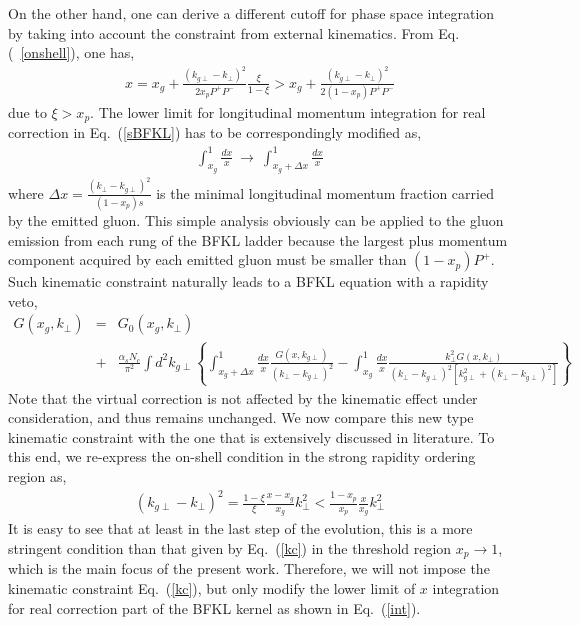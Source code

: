 \documentclass[prd,aps,preprint,tightenlines,nofootinbib,superscriptaddress]{revtex4}
\begin{document}
On the other hand, one can derive a different cutoff for phase space integration by taking into account the constraint from external kinematics.  From Eq.(~\ref{onshell}), one has,
 \begin{eqnarray}
 x = x_g+\frac{(k_{g\perp}-k_\perp)^2  }{2x_p P^+ P^-} \frac{\xi}{1-\xi}> x_g+\frac{(k_{g\perp}-k_\perp)^2  }{2(1-x_p) P^+ P^-} 
 \label{detx}
\end{eqnarray}
due to $\xi>x_p$. The lower limit for longitudinal momentum integration for real correction in Eq.~(\ref{sBFKL}) has to be correspondingly modified as,
 \begin{eqnarray}
\int_{x_g}^1 \frac{dx}{x} \  \longrightarrow \ \int_{x_g+\Delta x}^1 \frac{dx}{x}
\end{eqnarray}
where $\Delta x= \frac{(k_\perp-k_{g\perp})^2}{(1-x_p)s}$ is the minimal longitudinal momentum fraction carried by the emitted gluon.  This simple analysis obviously can be applied to the gluon emission from each rung of the BFKL ladder because the largest plus momentum component acquired by each emitted gluon must be smaller than $(1-x_p) P^+$.  Such kinematic constraint naturally leads to a  BFKL equation with a rapidity veto,
  \begin{eqnarray}
  G(x_g,k_{\perp}) \!\!&=&\!\! G_0(x_g,k_{\perp})   \label{int}
   \\ &+&\!\! \frac{ \alpha_s N_c}{\pi^2} \!\!  \int \!\! d^2 k_{g\perp}   \!\! \left \{ \int_{x_g+\Delta x}^{1}\!\! \frac{d x}{x} \frac{ G(x,k_{g\perp})}{(k_\perp-k_{g\perp})^2} 
 - \int_{x_g}^{1}\!\! \frac{d x}{x} \frac{k_\perp^2 G(x,k_{\perp})}{(k_\perp-k_{g\perp})^2 \left [k_{g\perp}^2+(k_\perp-k_{g\perp})^2\right ]  
 }   \right \}  \nonumber 
 \end{eqnarray}
Note that the virtual correction is not affected by the kinematic effect under consideration, and thus remains unchanged. 
 We now compare this new type kinematic constraint with the one that is extensively discussed in literature.  To this end, we re-express the on-shell condition  in the strong rapidity ordering region as,   
 \begin{eqnarray}
(k_{g\perp}-k_\perp)^2  =\frac{1-\xi}{\xi} \frac{x-x_g}{x_g} k_\perp^2< \frac{1-x_p}{x_p}\frac{x}{x_g} k_\perp^2
\end{eqnarray}
It is easy to see that at least in the last step of the evolution, this is a more stringent condition than that given by Eq.~(\ref{kc}) in the threshold region $x_p \rightarrow 1$, which is the main focus of the present work. Therefore, we will not impose the kinematic constraint  Eq.~(\ref{kc}), but only modify the lower  limit of $x$  integration for real correction part of the BFKL kernel as shown in Eq.~(\ref{int}).
\end{document}
